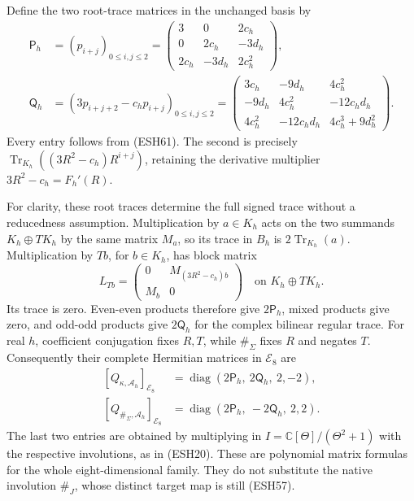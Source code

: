 \documentclass[
  10pt,
  a4paper,
]{article}
\begin{document}
Define the two root-trace matrices in the unchanged basis by \[
\begin{aligned}
\mathsf P_h&=(p_{i+j})_{0\le i,j\le2}
=\begin{pmatrix}
3&0&2c_h\\
0&2c_h&-3d_h\\
2c_h&-3d_h&2c_h^2
\end{pmatrix},\\
\mathsf Q_h&=(3p_{i+j+2}-c_hp_{i+j})_{0\le i,j\le2}
=\begin{pmatrix}
3c_h&-9d_h&4c_h^2\\
-9d_h&4c_h^2&-12c_hd_h\\
4c_h^2&-12c_hd_h&4c_h^3+9d_h^2
\end{pmatrix}.
\end{aligned}
\tag{ESH62}
\] Every entry follows from (ESH61). The second is precisely
\(\operatorname{Tr}_{K_h}((3R^2-c_h)R^{i+j})\), retaining the derivative
multiplier \(3R^2-c_h=F_h'(R)\).

For clarity, these root traces determine the full signed trace without a
reducedness assumption. Multiplication by \(a\in K_h\) acts on the two
summands \(K_h\oplus TK_h\) by the same matrix \(M_a\), so its trace in
\(B_h\) is \(2\operatorname{Tr}_{K_h}(a)\). Multiplication by \(Tb\),
for \(b\in K_h\), has block matrix \[
L_{Tb}=\begin{pmatrix}0&M_{(3R^2-c_h)b}\\M_b&0\end{pmatrix}
\quad\text{on }K_h\oplus TK_h.
\tag{ESH63}
\] Its trace is zero. Even-even products therefore give
\(2\mathsf P_h\), mixed products give zero, and odd-odd products give
\(2\mathsf Q_h\) for the complex bilinear regular trace. For real \(h\),
coefficient conjugation fixes \(R,T\), while \(\#_\Sigma\) fixes \(R\)
and negates \(T\). Consequently their complete Hermitian matrices in
\(\mathcal E_8\) are \[
\begin{aligned}
[Q_{\kappa,\mathcal A_h}]_{\mathcal E_8}
&=\operatorname{diag}(2\mathsf P_h,\ 2\mathsf Q_h,\ 2,-2),\\
[Q_{\#_\Sigma,\mathcal A_h}]_{\mathcal E_8}
&=\operatorname{diag}(2\mathsf P_h,\ -2\mathsf Q_h,\ 2,2).
\end{aligned}
\tag{ESH64}
\] The last two entries are obtained by multiplying in
\(I=\mathbb C[\Theta]/(\Theta^2+1)\) with the respective involutions, as
in (ESH20). These are polynomial matrix formulas for the whole
eight-dimensional family. They do not substitute the native involution
\(\#_J\), whose distinct target map is still (ESH57).
\end{document}
